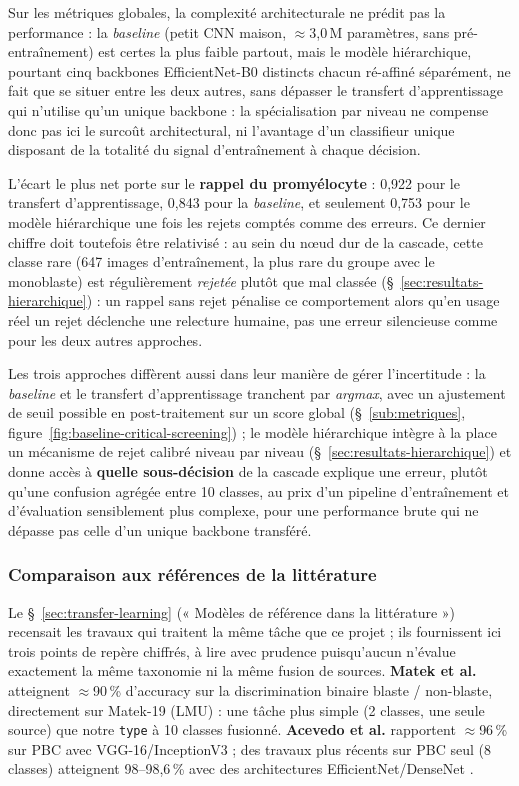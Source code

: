 Sur les métriques globales, la complexité architecturale ne prédit pas la performance : la \emph{baseline} (petit CNN maison, $\approx$3,0\,M paramètres, sans pré-entraînement) est certes la plus faible partout, mais le modèle hiérarchique, pourtant cinq backbones EfficientNet-B0 distincts chacun ré-affiné séparément, ne fait que se situer entre les deux autres, sans dépasser le transfert d'apprentissage qui n'utilise qu'un unique backbone : la spécialisation par niveau ne compense donc pas ici le surcoût architectural, ni l'avantage d'un classifieur unique disposant de la totalité du signal d'entraînement à chaque décision.

L'écart le plus net porte sur le \textbf{rappel du promyélocyte} : 0,922 pour le transfert d'apprentissage, 0,843 pour la \emph{baseline}, et seulement 0,753 pour le modèle hiérarchique une fois les rejets comptés comme des erreurs.
Ce dernier chiffre doit toutefois être relativisé : au sein du n\oe{}ud dur de la cascade, cette classe rare (647 images d'entraînement, la plus rare du groupe avec le monoblaste) est régulièrement \emph{rejetée} plutôt que mal classée (\S~\ref{sec:resultats-hierarchique}) : un rappel \og sans rejet \fg{} pénalise ce comportement alors qu'en usage réel un rejet déclenche une relecture humaine, pas une erreur silencieuse comme pour les deux autres approches.

Les trois approches diffèrent aussi dans leur manière de gérer l’incertitude : la \emph{baseline} et le transfert d'apprentissage tranchent par \emph{argmax}, avec un ajustement de seuil possible en post-traitement sur un score global (\S~\ref{sub:metriques}, figure~\ref{fig:baseline-critical-screening}) ; le modèle hiérarchique intègre à la place un mécanisme de rejet calibré niveau par niveau (\S~\ref{sec:resultats-hierarchique}) et donne accès à \textbf{quelle sous-décision} de la cascade explique une erreur, plutôt qu'une confusion agrégée entre 10 classes, au prix d'un pipeline d'entraînement et d'évaluation sensiblement plus complexe, pour une performance brute qui ne dépasse pas celle d'un unique backbone transféré.

\subsubsection{Comparaison aux références de la littérature}
\label{sec:comparaison-litterature}

Le \S~\ref{sec:transfer-learning} (« Modèles de référence dans la littérature ») recensait les travaux qui traitent la même tâche que ce projet ; ils fournissent ici trois points de repère chiffrés, à lire avec prudence puisqu'aucun n'évalue exactement la même taxonomie ni la même fusion de sources.
\textbf{Matek et al.} \parencite{matek2019nmi} atteignent $\approx$90\,\% d'accuracy sur la discrimination binaire blaste / non-blaste, directement sur Matek-19 (LMU) : une tâche plus simple (2 classes, une seule source) que notre \texttt{type} à 10 classes fusionné.
\textbf{Acevedo et al.} \parencite{acevedo2019cnn} rapportent $\approx$96\,\% sur PBC avec VGG-16/InceptionV3 ; des travaux plus récents sur PBC seul (8 classes) atteignent 98--98,6\,\% avec des architectures EfficientNet/DenseNet \parencite{asghar2024tenclasses,asghar2023allbloodcell}.


